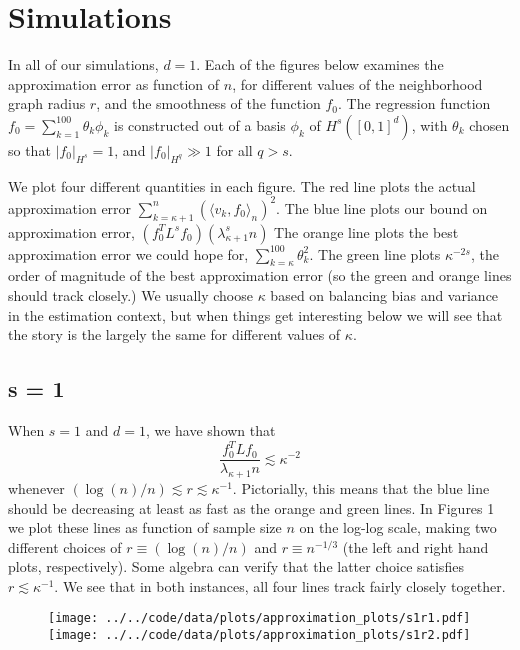 \documentclass{article}
\newcommand{\1}{\mathbf{1}}
\newcommand{\dotp}[2]{\langle #1, #2 \rangle}
\theoremstyle{alden}
\theoremstyle{aldenthm}
\theoremstyle{definition}
\theoremstyle{remark}
\begin{document}
\section{Simulations}
In all of our simulations, $d = 1$. Each of the figures below examines the approximation error as function of $n$, for different values of the neighborhood graph radius $r$, and the smoothness of the function $f_0$. The regression function $f_0 = \sum_{k = 1}^{100} \theta_k \phi_k$ is constructed out of a basis $\phi_k$ of $H^s([0,1]^d)$, with $\theta_k$ chosen so that $|f_0|_{H^s} = 1$, and $|f_0|_{H^{q}} \gg 1$ for all $q > s$.

We plot four different quantities in each figure. The red line plots the actual approximation error $\sum_{k = \kappa + 1}^{n} (\dotp{v_k}{f_0}_n)^2$. The blue line plots our bound on approximation error, $(f_0^T L^s f_0)(\lambda_{\kappa + 1}^s n)$  The orange line plots the best approximation error we could hope for, $\sum_{k = \kappa}^{100} \theta_k^2$. The green line plots ${\kappa}^{-2s}$, the order of magnitude of the best approximation error (so the green and orange lines should track closely.) We usually choose $\kappa$ based on balancing bias and variance in the estimation context, but when things get interesting below we will see that the story is the largely the same for different values of $\kappa$. 

\subsection{s = 1}

When $s = 1$ and $d = 1$, we have shown that 
\begin{equation*}
\frac{f_0^T L f_0}{\lambda_{\kappa + 1} n} \lesssim \kappa^{-2}
\end{equation*}
whenever $(\log(n)/n) \lesssim r \lesssim \kappa^{-1}$. Pictorially, this means that the blue line should be decreasing at least as fast as the orange and green lines. In Figures 1 we plot these lines as function of sample size $n$ on the log-log scale, making two different choices of $r \equiv (\log(n)/n)$ and $r \equiv n^{-1/3}$ (the left and right hand plots, respectively). Some algebra can verify that the latter choice satisfies $r \lesssim \kappa^{-1}$. We see that in both instances, all four lines track fairly closely together.

\begin{figure}[!ht]
	\centering
	\texttt{[image: ../../code/data/plots/approximation\_plots/s1r1.pdf]}
	\texttt{[image: ../../code/data/plots/approximation\_plots/s1r2.pdf]}
\end{figure}
\end{document}
